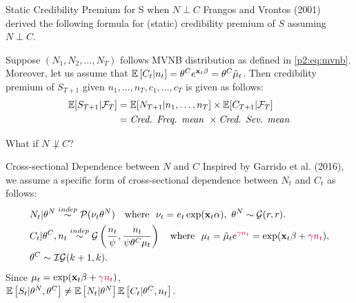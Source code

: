 \documentclass[ignorenonframetext,]{beamer}
\begin{document}
\begin{frame}{Static Credibility Premium for S when $N \perp C$}
Frangos and Vrontos (2001) derived the following formula for (static) credibility premium of $S$ assuming $N \perp C$.
\begin{theorem}
Suppose $(N_1, N_2, \ldots, N_T)$ follows MVNB distribution as defined in \eqref{p2:eq:mvnb}. Moreover, let us assume that ${\mathbb E}\left[C_t|n_t\right] = \theta^C e^{\mathbf{x}_t \beta} = \theta^C \tilde{\mu}_t$. Then credibility premium of $S_{T+1}$ given $n_1, \ldots, n_T, c_1, \ldots, c_T$ is given as follows:
\begin{align*}
\mathbb{E}[S_{T+1}|\mathcal{F}_T] &= \mathbb{E}[N_{T+1}|n_1, \ldots, n_T] \times \mathbb{E}[C_{T+1}|\mathcal{F}_T] \\
&= \text{\emph{Cred. Freq. mean}} \ \times \text{\emph{Cred. Sev. mean}}
\end{align*}
\end{theorem}
\pause
{\color{purple} What if $N \not\perp C$?}
\end{frame}

\begin{frame}{Cross-sectional Dependence between $N$ and $C$}
Inspired by Garrido et al. (2016), we assume a specific form of cross-sectional dependence between $N_t$ and $C_t$ as follows:
\begin{equation}\label{p2:eq:crossdep}
\begin{aligned}
&N_t|\theta^N \overset{indep}{\sim} \mathcal{P}(\nu_t \theta^N) \quad \text{where} \ \ \nu_t = e_t \exp(\mathbf{x}_t \alpha), \ \theta^N \sim \mathcal{G}(r,r). \\
&C_t|\theta^C, n_t \overset{indep}{\sim} \mathcal{G}\left(\frac{n_t}{\psi}, \frac{n_t}{\psi\theta^C\mu_t}\right) \quad \text{where} \ \ \mu_t = \tilde{\mu}_t e^{{\color{purple}\gamma n_t}} = \exp(\mathbf{x}_t\beta + {\color{purple}\gamma n_t}), \\
&\theta^C \sim \mathcal{IG}(k+1,k).
\end{aligned}
\end{equation}
Since $\mu_t = \exp(\mathbf{x}_t\beta + {\color{purple}\gamma n_t})$, \\
${\mathbb E}\left[S_t|\theta^N, \theta^C\right] \neq {\mathbb E}\left[N_t|\theta^N\right]{\mathbb E}\left[C_t|\theta^C, n_t\right]$.
\end{frame}
\end{document}
